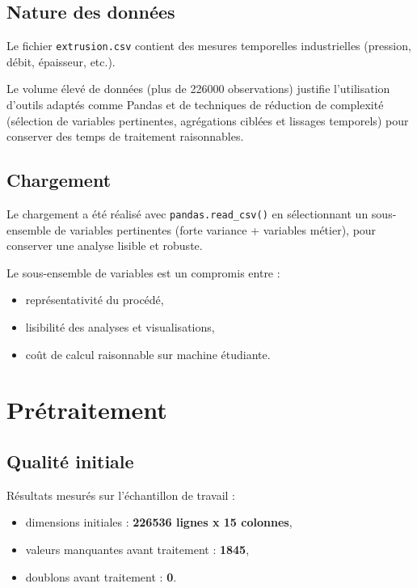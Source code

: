 \documentclass[11pt,a4paper]{article}
\begin{document}
\subsection{Nature des données}
Le fichier \texttt{extrusion.csv} contient des mesures temporelles industrielles (pression, débit, épaisseur, etc.).

Le volume élevé de données (plus de 226000 observations) justifie l'utilisation d'outils adaptés comme Pandas et de techniques de réduction de complexité (sélection de variables pertinentes, agrégations ciblées et lissages temporels) pour conserver des temps de traitement raisonnables.

\subsection{Chargement}
Le chargement a été réalisé avec \texttt{pandas.read\_csv()} en sélectionnant un sous-ensemble de variables pertinentes (forte variance + variables métier), pour conserver une analyse lisible et robuste.

Le sous-ensemble de variables est un compromis entre :
\begin{itemize}
  \item représentativité du procédé,
  \item lisibilité des analyses et visualisations,
  \item coût de calcul raisonnable sur machine étudiante.
\end{itemize}

\section{Prétraitement}
\subsection{Qualité initiale}
Résultats mesurés sur l'échantillon de travail :
\begin{itemize}
  \item dimensions initiales : \textbf{226536 lignes x 15 colonnes},
  \item valeurs manquantes avant traitement : \textbf{1845},
  \item doublons avant traitement : \textbf{0}.
\end{itemize}
\end{document}
